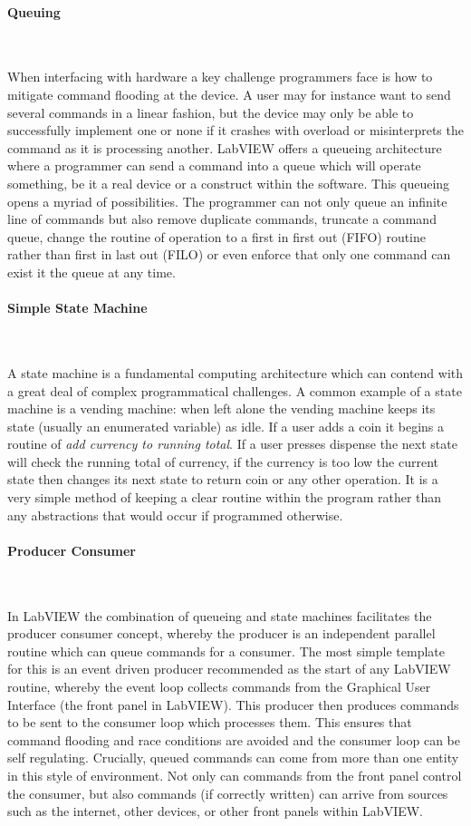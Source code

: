 \paragraph{Queuing}~

When interfacing with hardware a key challenge programmers face is how to mitigate command flooding at the device.
A user may for instance want to send several commands in a linear fashion, but the device may only be able to successfully implement one or none if it crashes with overload or misinterprets the command as it is processing another.
LabVIEW offers a queueing architecture where a programmer can send a command into a queue which will operate something, be it a real device or a construct within the software.
This queueing opens a myriad of possibilities.
The programmer can not only queue an infinite line of commands but also remove duplicate commands, truncate a command queue, change the routine of operation to a first in first out (FIFO) routine rather than first in last out (FILO) or even enforce that only one command can exist it the queue at any time.

\paragraph{Simple State Machine}~

A state machine is a fundamental computing architecture which can contend with a great deal of complex programmatical challenges.
A common example of a state machine is a vending machine: when left alone the vending machine keeps its state (usually an enumerated variable) as idle.
If a user adds a coin it begins a routine of \textit{add currency to running total}.
If a user presses dispense the next state will check the running total of currency, if the currency is too low the current state then changes its next state to return coin or any other operation.
It is a very simple method of keeping a clear routine within the program rather than any abstractions that would occur if programmed otherwise.


\paragraph{Producer Consumer}~

In LabVIEW the combination of queueing and state machines facilitates the producer consumer concept, whereby the producer is an independent parallel routine which can queue commands for a consumer.
The most simple template for this is an event driven producer recommended as the start of any LabVIEW routine, whereby the event loop collects commands from the Graphical User Interface (the front panel in LabVIEW).
This producer then produces commands to be sent to the consumer loop which processes them.
This ensures that command flooding and race conditions are avoided and the consumer loop can be self regulating.
Crucially, queued commands can come from more than one entity in this style of environment.
Not only can commands from the front panel control the consumer, but also commands (if correctly written) can arrive from sources such as the internet, other devices, or other front panels within LabVIEW.

